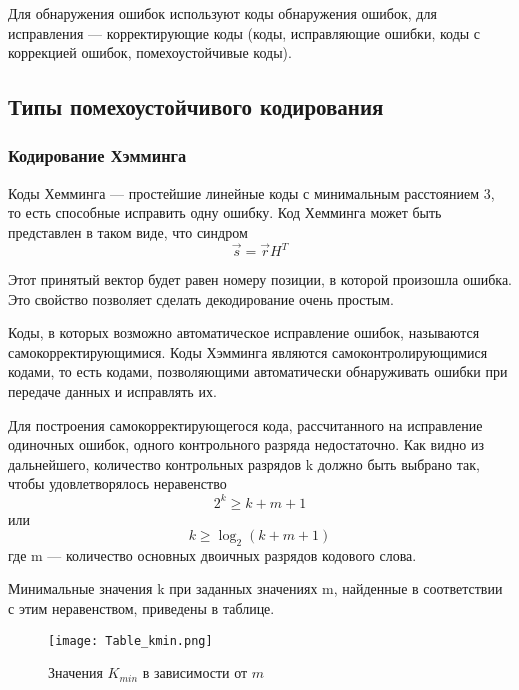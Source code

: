 Для обнаружения ошибок используют коды обнаружения ошибок, для исправления — корректирующие коды (коды, исправляющие ошибки, коды с коррекцией ошибок, помехоустойчивые коды).

\subsection{Типы помехоустойчивого кодирования}
\subsubsection{Кодирование Хэмминга}
Коды Хемминга — простейшие линейные коды с минимальным расстоянием 3, то есть способные исправить одну ошибку. Код Хемминга может быть представлен в таком виде, что синдром
\begin{equation}
\vec{s} = \vec{r} H^T
\end{equation}

Этот принятый вектор будет равен номеру позиции, в которой произошла ошибка. Это свойство позволяет сделать декодирование очень простым.

Коды, в которых возможно автоматическое исправление ошибок, называются самокорректирующимися. Коды Хэмминга являются самоконтролирующимися кодами, то есть кодами, позволяющими автоматически обнаруживать ошибки при передаче данных и исправлять их.

Для построения самокорректирующегося кода, рассчитанного на исправление одиночных ошибок, одного контрольного разряда недостаточно. Как видно из дальнейшего, количество контрольных разрядов k должно быть выбрано так, чтобы удовлетворялось неравенство 
\begin{equation}
2^{k}\geq k+m+1
\end{equation}
или  
\begin{equation}
k \geq \log _{2}(k+m+1) 
\end{equation}
где m — количество основных двоичных разрядов кодового слова.

Минимальные значения k при заданных значениях m, найденные в соответствии с этим неравенством, приведены в таблице.
\begin{figure}[H]
	\begin{center}
		\texttt{[image: Table\_kmin.png]}
		\caption{Значения $K_{min}$ в зависимости от $m$} %
		\label{Table_kmin} %
	\end{center}
\end{figure}

